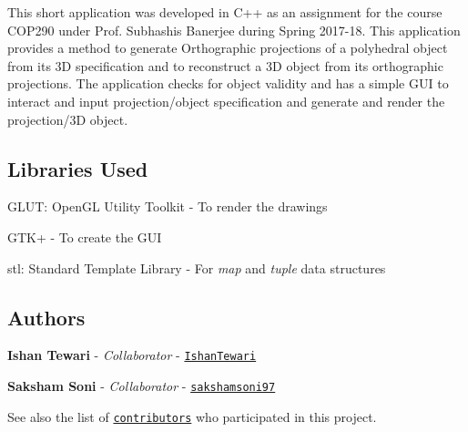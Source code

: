 This short application was developed in C++ as an assignment for the course C\+O\+P290 under Prof. Subhashis Banerjee during Spring 2017-\/18. This application provides a method to generate Orthographic projections of a polyhedral object from its 3D specification and to reconstruct a 3D object from its orthographic projections. The application checks for object validity and has a simple G\+UI to interact and input projection/object specification and generate and render the projection/3D object.

\subsection*{Libraries Used}


\begin{DoxyItemize}
\item G\+L\+UT\+: Open\+GL Utility Toolkit -\/ To render the drawings
\item G\+T\+K+ -\/ To create the G\+UI
\item stl\+: Standard Template Library -\/ For {\itshape map} and {\itshape tuple} data structures
\end{DoxyItemize}

\subsection*{Authors}


\begin{DoxyItemize}
\item {\bfseries Ishan Tewari} -\/ {\itshape Collaborator} -\/ \href{https://github.com/IshanTewari}{\tt Ishan\+Tewari}
\item {\bfseries Saksham Soni} -\/ {\itshape Collaborator} -\/ \href{https://github.com/sakshamsoni97}{\tt sakshamsoni97}
\end{DoxyItemize}

See also the list of \href{https://github.com/sakshamsoni97/cadapp/contributors}{\tt contributors} who participated in this project. 